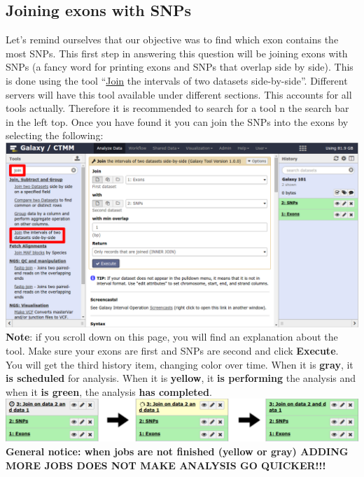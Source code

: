 \documentclass[11pt,a4paper]{article}
\begin{document}
\subsection{Joining exons with SNPs}
Let's remind ourselves that our objective was to find which exon contains the most SNPs. This first step in answering this question will be joining exons with SNPs (a fancy word for printing exons and SNPs that overlap side by side). This is done using the tool ``\underline{Join} the intervals of two datasets side-by-side''.
Different servers will have this tool available under different sections. This accounts for all tools actually. Therefore it is recommended to search for a tool n the search bar in the left top. Once you have found it you can join the SNPs into the exons by selecting the following:\\
\includegraphics[width=\textwidth]{figures/101_11}\\
\textbf{Note}: if you scroll down on this page, you will find an explanation about the tool. Make sure your exons are first and SNPs are second and click \textbf{Execute}. You will get the third history item, changing color over time. When it is \textbf{gray}, it \textbf{is scheduled} for analysis. When it is \textbf{yellow}, it \textbf{is performing} the analysis and when it \textbf{is green}, the analysis \textbf{has completed}. \\
\includegraphics[width=\textwidth]{figures/101_12}\\
\textbf{General notice: when jobs are not finished (yellow or gray) ADDING MORE JOBS DOES NOT MAKE ANALYSIS GO QUICKER!!!}\\
\\
\end{document}
